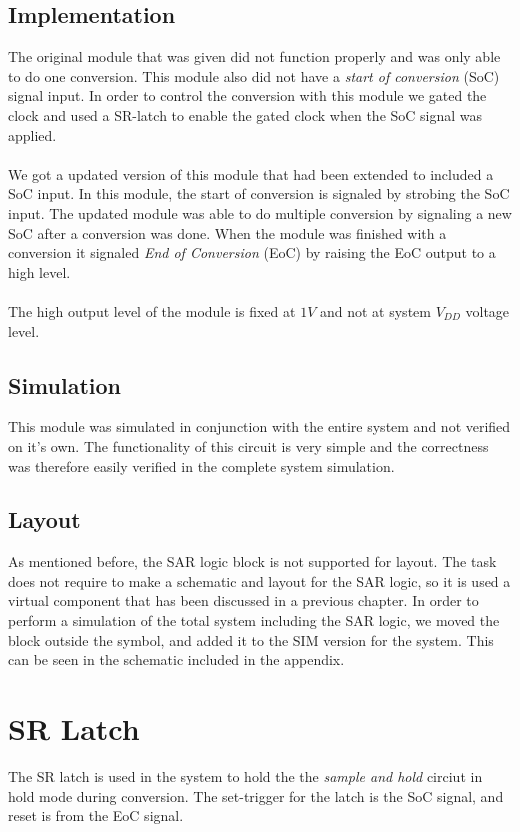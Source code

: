 \documentclass[english, 12pt, a4paper]{ifimaster}
\begin{document}
\subsection{Implementation}
The original module that was given did not function properly and was only able to do one conversion. This module also did not have a \textit{start of conversion} (SoC) signal input.
In order to control the conversion with this module we gated the clock and used a SR-latch to enable the gated clock when the SoC signal was applied.\\
\\
We got a updated version of this module that had been extended to included a SoC input. In this module, the start of conversion is signaled by strobing the SoC input.
The updated module was able to do multiple conversion by signaling a new SoC after a conversion was done. 
When the module was finished with a conversion it signaled \textit{End of Conversion} (EoC) by raising the EoC output to a high level. \\
\\
The high output level of the module is fixed at \(1 V\) and not at system \(V_{DD}\) voltage level.
\subsection{Simulation}
This module was simulated in conjunction with the entire system and not verified on it's own. 
The functionality of this circuit is very simple and the correctness was therefore easily verified in the complete system simulation.

\subsection{Layout}
As mentioned before, the SAR logic block is not supported for layout. The task does not require to make a schematic and layout for the SAR logic, so it is used a 
virtual component that has been discussed in a previous chapter. In order to perform a simulation of the total system including the SAR logic, we moved the block 
outside the symbol, and added it to the SIM version for the system. This can be seen in the schematic included in the appendix. 



\section{SR Latch}
The SR latch is used in the system to hold the the \textit{sample and hold} circiut in hold mode during conversion. 
The set-trigger for the latch is the SoC signal, and reset is from the EoC signal. 
\end{document}

